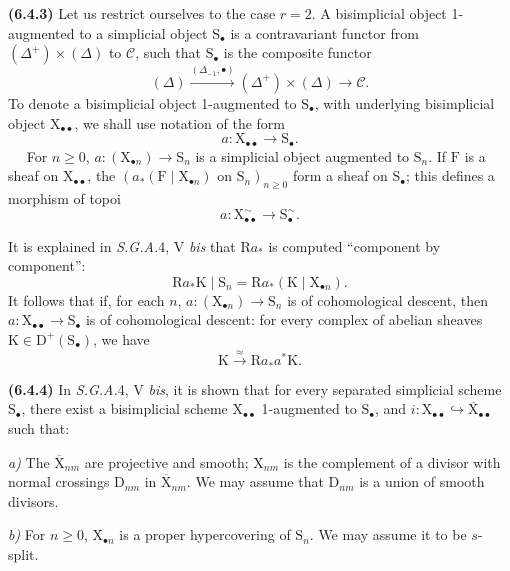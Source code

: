 \documentclass[11pt,leqno]{article}
\newcommand{\Page}[1]{\ifvmode\noindent\else\unskip\ \fi{\footnotesize\textcolor{gray}{[p.\,#1]}}\ \ignorespaces}
\begin{document}
\textbf{(6.4.3)} Let us restrict ourselves to the case \(r=2\). A bisimplicial object 1-augmented to a simplicial object \(\mathrm{S}_{\bullet}\) is a contravariant functor from \((\Delta^{+})\times(\Delta)\) to \(\mathscr{C}\), such that \(\mathrm{S}_{\bullet}\) is the composite functor
\[
(\Delta)\xrightarrow{(\Delta_{-1},\bullet)}
(\Delta^{+})\times(\Delta)\longrightarrow\mathscr{C}.
\]
To denote a bisimplicial object 1-augmented to \(\mathrm{S}_{\bullet}\), with underlying bisimplicial object \(\mathrm{X}_{\bullet\bullet}\), we shall use notation of the form
\[
a:\mathrm{X}_{\bullet\bullet}\to\mathrm{S}_{\bullet}.
\]
\Page{23}
For \(n\geq 0\), \(a:(\mathrm{X}_{\bullet n})\to\mathrm{S}_n\) is a simplicial object augmented to \(\mathrm{S}_n\). If \(\mathrm{F}\) is a sheaf on \(\mathrm{X}_{\bullet\bullet}\), the \((a_{\ast}(\mathrm{F}\mid\mathrm{X}_{\bullet n})\text{ on }\mathrm{S}_n)_{n\geq 0}\) form a sheaf on \(\mathrm{S}_{\bullet}\); this defines a morphism of topoi
\[
a:\mathrm{X}_{\bullet\bullet}^{\sim}\to\mathrm{S}_{\bullet}^{\sim}.
\]

It is explained in \textit{S.G.A.}4, V \textit{bis} that \(\mathrm{R}a_{\ast}\) is computed “component by component”:
\[
\mathrm{R}a_{\ast}\mathrm{K}\mid\mathrm{S}_n
=\mathrm{R}a_{\ast}(\mathrm{K}\mid\mathrm{X}_{\bullet n}).
\]
It follows that if, for each \(n\), \(a:(\mathrm{X}_{\bullet n})\to\mathrm{S}_n\) is of cohomological descent, then \(a:\mathrm{X}_{\bullet\bullet}\to\mathrm{S}_{\bullet}\) is of cohomological descent: for every complex of abelian sheaves \(\mathrm{K}\in\mathrm{D}^{+}(\mathrm{S}_{\bullet})\), we have
\[
\mathrm{K}\xrightarrow{\approx}\mathrm{R}a_{\ast}a^{\ast}\mathrm{K}.
\]

\textbf{(6.4.4)} In \textit{S.G.A.}4, V \textit{bis}, it is shown that for every separated simplicial scheme \(\mathrm{S}_{\bullet}\), there exist a bisimplicial scheme \(\mathrm{X}_{\bullet\bullet}\) 1-augmented to \(\mathrm{S}_{\bullet}\), and \(i:\mathrm{X}_{\bullet\bullet}\hookrightarrow\overline{\mathrm{X}}_{\bullet\bullet}\) such that:

\textit{a)} The \(\overline{\mathrm{X}}_{nm}\) are projective and smooth; \(\mathrm{X}_{nm}\) is the complement of a divisor with normal crossings \(\mathrm{D}_{nm}\) in \(\overline{\mathrm{X}}_{nm}\). We may assume that \(\mathrm{D}_{nm}\) is a union of smooth divisors.

\textit{b)} For \(n\geq 0\), \(\mathrm{X}_{\bullet n}\) is a proper hypercovering of \(\mathrm{S}_n\). We may assume it to be \(s\)-split.
\end{document}
